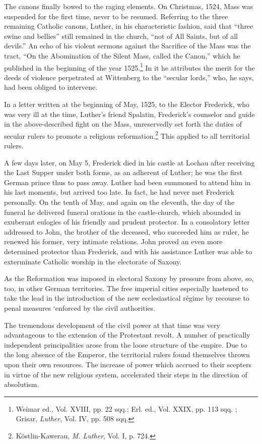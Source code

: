 The canons finally bowed to the raging elements. On Christmas,
1524, Mass was suspended for the first time, never to be resumed.
Referring to the three remaining Catholic canons, Luther, in his
characteristic fashion, said that “three swine and bellies” still remained
in the church, “not of All Saints, but of all devils.”
An echo of his violent sermons against the Sacrifice of the Mass
was the tract, “On the Abomination of the Silent Mass, called the
Canon,” which he published in the beginning of the year 1525.\footnote
{Weimar ed., Vol. XVIII, pp. 22 sqq.; Erl. ed., Vol. XXIX, pp. 113 sqq. ; Grisar,
\textit{Luther}, Vol. IV, pp. 508 sqq.}
In it he attributes the merit for the deeds of violence perpetrated at
Wittenberg to the “secular lords,” who, he says, had been obliged
to intervene.

In a letter written at the beginning of May, 1525, to the Elector
Frederick, who was very ill at the time, Luther’s friend Spalatin,
Frederick’s counselor and guide in the above-described fight on
the Mass, unreservedly set forth the duties of secular rulers to
promote a religious reformation.\footnote{Köstlin-Kawerau, \textit{M. Luther}, Vol. I, p. 724.}
This applied to all territorial rulers.

A few days later, on May 5, Frederick died in his castle at Lochau
after receiving the Last Supper under both forms, as an adherent of
Luther; he was the first German prince thus to pass away. Luther
had been summoned to attend him in his last moments, but arrived
too late. In fact, he had never met Frederick personally. On the
tenth of May, and again on the eleventh, the day of the funeral
he delivered funeral orations in the castle-church, which abounded
in exuberant eulogies of his friendly and prudent protector. In a
consolatory letter addressed to John, the brother of the deceased, who
succeeded him as ruler, he renewed his former, very intimate relations.
John proved an even more determined protector than Frederick,
and with his assistance Luther was able to exterminate Catholic worship
in the electorate of Saxony.

As the Reformation was imposed in electoral Saxony by pressure
from above, so, too, in other German territories. The free imperial
cities especially hastened to take the lead in the introduction of the
new ecclesiastical régime by recourse to penal measures ‘enforced
by the civil authorities.

The tremendous development of the civil power at that time was
very advantageous to the extension of the Protestant revolt. A
number of practically independent principalities arose from the loose
structure of the empire. Due to the long absence of the Emperor,
the territorial rulers found themselves thrown upon their own resources.
The increase of power which accrued to their scepters in
virtue of the new religious system, accelerated their steps in the
direction of absolutism.

